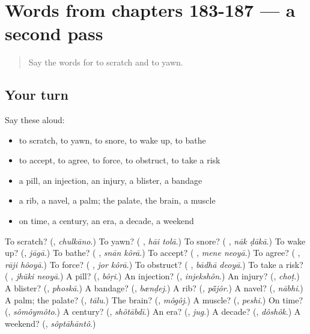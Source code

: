 \section[(dialogue)]{Words from chapters 183-187 — a second pass}

\label{lesson:BN-R187-second-pass-words-from-chapters-183-187}



\begin{quote}
Say the words for to scratch and to yawn.
\end{quote}

\subsection*{Your turn}
Say these aloud:

\begin{itemize}
\raggedright
  \item to scratch, to yawn, to snore, to wake up, to bathe
  \item to accept, to agree, to force, to obstruct, to take a risk
  \item a pill, an injection, an injury, a blister, a bandage
  \item a rib, a navel, a palm; the palate, the brain, a muscle
  \item on time, a century, an era, a decade, a weekend
\end{itemize}

\begin{tcolorbox}[breakable,colback=teal!4,colframe=teal!35!black,title={Before you move on}]
To scratch? (\textbf{}, \emph{chulkāno}.) To yawn? (\textbf{ }, \emph{hāi tolā}.) To snore? (\textbf{ }, \emph{nāk ḍākā}.) To wake up? (\textbf{}, \emph{jāgā}.) To bathe? (\textbf{ }, \emph{snān kôrā}.) To accept? (\textbf{ }, \emph{mene neoyā}.) To agree? (\textbf{ }, \emph{rāji hôoyā}.) To force? (\textbf{ }, \emph{jor kôrā}.) To obstruct? (\textbf{ }, \emph{bādhā deoyā}.) To take a risk? (\textbf{ }, \emph{jhũki neoyā}.) A pill? (\textbf{}, \emph{bôṛi}.) An injection? (\textbf{}, \emph{injekshôn}.) An injury? (\textbf{}, \emph{choṭ}.) A blister? (\textbf{}, \emph{phoskā}.) A bandage? (\textbf{}, \emph{bænḍej}.) A rib? (\textbf{}, \emph{pā̃jôr}.) A navel? (\textbf{}, \emph{nābhi}.) A palm; the palate? (\textbf{}, \emph{tālu}.) The brain? (\textbf{}, \emph{môgôj}.) A muscle? (\textbf{}, \emph{peshi}.) On time? (\textbf{}, \emph{sômôymôto}.) A century? (\textbf{}, \emph{shôtābdī}.) An era? (\textbf{}, \emph{jug}.) A decade? (\textbf{}, \emph{dôshôk}.) A weekend? (\textbf{}, \emph{sôptāhāntô}.)
\end{tcolorbox}

